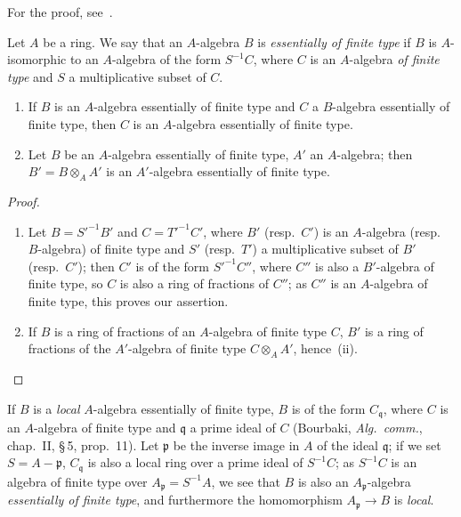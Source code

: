For the proof, see~.

\begin{env}[1.3.8]
\label{IV.1.3.8}
Let $A$ be a ring. We say that an $A$-algebra $B$ is \emph{essentially of finite type}
if $B$ is $A$-isomorphic to an $A$-algebra of the form $S^{-1}C$, where $C$ is an $A$-algebra \emph{of
finite type} and $S$ a multiplicative subset of $C$.
\end{env}

\begin{proposition}[1.3.9]
\label{IV.1.3.9}
\medskip\noindent
\begin{enumerate}[label=(\roman*)]
  \item If $B$ is an $A$-algebra essentially of finite type and $C$
    a $B$-algebra essentially of finite type, then $C$ is an $A$-algebra essentially of finite type.
  \item Let $B$ be an $A$-algebra essentially of finite type, $A'$ an $A$-algebra; then $B'=B\otimes_A A'$
    is an $A'$-algebra essentially of finite type.
\end{enumerate}
\end{proposition}

\begin{proof}
\begin{enumerate}[label=(\roman*)]
  \item Let $B=S'^{-1}B'$ and $C=T'^{-1}C'$, where $B'$ (resp.\ $C'$) is an $A$-algebra (resp.\
    $B$-algebra) of finite type and $S'$ (resp.\ $T'$) a multiplicative subset of $B'$ (resp.\ $C'$);
    then $C'$ is of the form $S'^{-1}C''$, where $C''$ is also a $B'$-algebra of finite type, so $C$ is also
    a ring of fractions of $C''$; as $C''$ is an $A$-algebra of finite type, this proves
    our assertion.
  \item If $B$ is a ring of fractions of an $A$-algebra of finite type $C$, $B'$ is a ring
    of fractions of the $A'$-algebra of finite type $C\otimes_A A'$, hence~(ii).
\end{enumerate}
\end{proof}

\begin{env}[1.3.10]
\label{IV.1.3.10}
If $B$ is a \emph{local} $A$-algebra essentially of finite type, $B$ is of the
form $C_{\mathfrak{q}}$, where $C$ is an $A$-algebra of finite type and $\mathfrak{q}$ a prime ideal of $C$ (Bourbaki,
\emph{Alg.\ comm.}, chap.~II, \S\,5, prop.~11). Let $\mathfrak{p}$ be the inverse image in $A$ of the ideal $\mathfrak{q}$; if we set
$S=A-\mathfrak{p}$, $C_{\mathfrak{q}}$ is also a local ring over a prime ideal of $S^{-1}C$; as $S^{-1}C$
is an algebra of finite type over $A_{\mathfrak{p}}=S^{-1}A$, we see that $B$ is also an $A_{\mathfrak{p}}$-algebra \emph{essentially
of finite type}, and furthermore the homomorphism $A_{\mathfrak{p}}\to B$ is \emph{local}.
\end{env}


